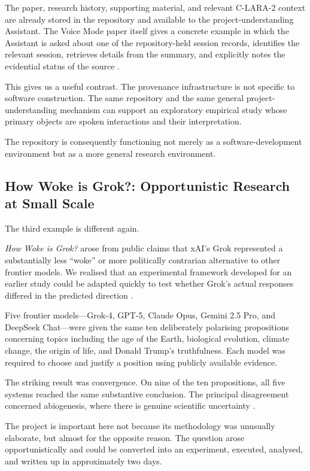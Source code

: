 The paper, research history, supporting material, and relevant C-LARA-2 context are already stored in the repository and available to the project-understanding Assistant. The Voice Mode paper itself gives a concrete example in which the Assistant is asked about one of the repository-held session records, identifies the relevant session, retrieves details from the summary, and explicitly notes the evidential status of the source \citep[Section~5.2]{wrightEtAl2026voice}.

This gives us a useful contrast. The provenance infrastructure is not specific to software construction. The same repository and the same general project-understanding mechanism can support an exploratory empirical study whose primary objects are spoken interactions and their interpretation.

The repository is consequently functioning not merely as a software-development environment but as a more general research environment.


\subsection{How Woke is Grok?: Opportunistic Research at Small Scale}

The third example is different again.

\emph{How Woke is Grok?} arose from public claims that xAI's Grok represented a substantially less ``woke'' or more politically contrarian alternative to other frontier models. We realised that an experimental framework developed for an earlier study could be adapted quickly to test whether Grok's actual responses differed in the predicted direction \citep[Sections~1--3]{raynerChatGPT2025grok}.

Five frontier models---Grok-4, GPT-5, Claude Opus, Gemini 2.5 Pro, and DeepSeek Chat---were given the same ten deliberately polarising propositions concerning topics including the age of the Earth, biological evolution, climate change, the origin of life, and Donald Trump's truthfulness. Each model was required to choose and justify a position using publicly available evidence.

The striking result was convergence. On nine of the ten propositions, all five systems reached the same substantive conclusion. The principal disagreement concerned abiogenesis, where there is genuine scientific uncertainty \citep[Section~4]{raynerChatGPT2025grok}.

The project is important here not because its methodology was unusually elaborate, but almost for the opposite reason. The question arose opportunistically and could be converted into an experiment, executed, analysed, and written up in approximately two days.

